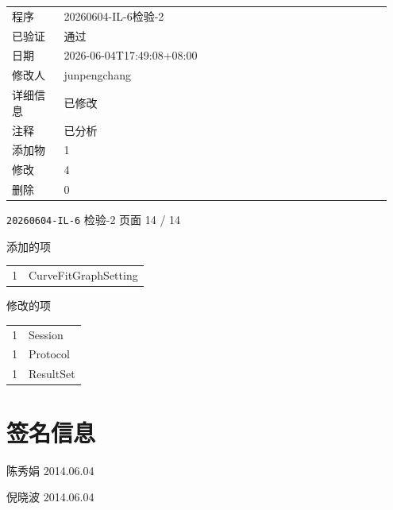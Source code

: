 \documentclass[UTF8,10pt,a4paper,fontset=fandol]{ctexart}
\newcommand{\handwritten}[1]{#1}
\begin{document}
\begin{flushleft}
\vspace{0.7em}

\begin{tabular}{@{}p{0.13\linewidth}p{0.82\linewidth}@{}}
程序 & 20260604-IL-6检验-2\\
已验证 & 通过\\
日期 & 2026-06-04T17:49:08+08:00\\
修改人 & junpengchang\\
详细信息 & 已修改\\
注释 & 已分析\\[0.3em]
添加物 & 1\\
修改 & 4\\
删除 & 0\\
\end{tabular}
\end{flushleft}


\newpage

\noindent\texttt{20260604-IL-6} 检验-2 \hfill 页面 14 / 14

\medskip

\noindent 添加的项

\begin{tabular}{@{}ll@{}}
1 & CurveFitGraphSetting
\end{tabular}

\medskip

\noindent 修改的项

\begin{tabular}{@{}ll@{}}
1 & Session\\
1 & Protocol\\
1 & ResultSet
\end{tabular}

\section*{签名信息}

\vfill

\begin{flushright}
\handwritten{陈秀娟}
\quad
\handwritten{2014.06.04}

\medskip

\handwritten{倪晓波}
\quad
\handwritten{2014.06.04}
\end{flushright}
\end{document}
